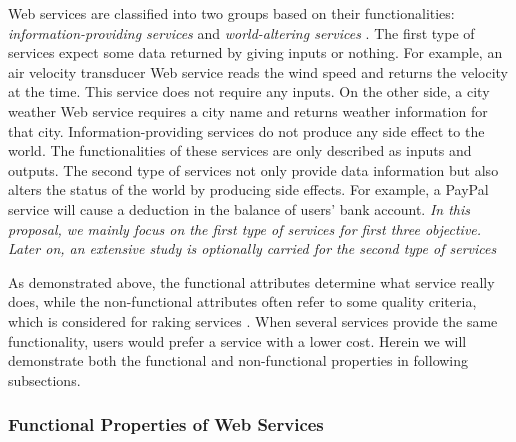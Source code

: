 Web services are classified into two groups based on their functionalities:  \emph{information-providing services} and \emph{world-altering services} \cite{mcilraith2001semantic}. The first type of services expect some data returned by giving inputs or nothing. For example, an air velocity transducer Web service reads the wind speed and returns the velocity at the time. This service does not require any inputs. On the other side, a city weather Web service requires a city name and returns weather information for that city. Information-providing services do not produce any side effect to the world. The functionalities of these services are only described as inputs and outputs. The second type of services not only provide data information but also alters the status of the world by producing side effects. For example, a PayPal service will cause a deduction in the balance of users' bank account. \emph{In this proposal, we mainly focus on the first type of services for first three objective. Later on, an extensive study is optionally carried for the second type of services}

As demonstrated above, the functional attributes determine what service really does, while the non-functional attributes often refer to some quality criteria, which is considered for raking services \cite{agarwal2009making}. When several services provide the same functionality, users would prefer a service with a lower cost. Herein we will demonstrate both the functional and non-functional properties in following subsections.



\subsubsection{Functional Properties of Web Services}\label{functional}

